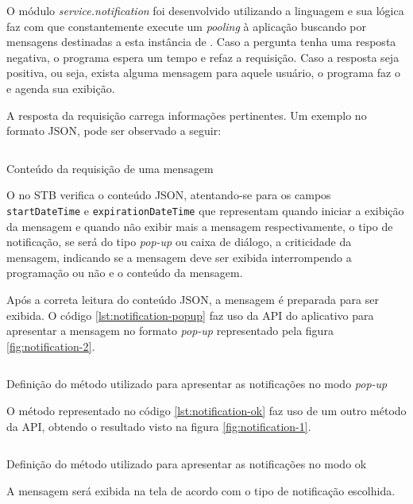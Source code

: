 O módulo \textit{service.notification} foi desenvolvido utilizando a linguagem
\python[] e sua lógica faz com que constantemente execute um \textit{pooling} à
aplicação buscando por mensagens destinadas a esta instância de \software. Caso
a pergunta tenha uma resposta negativa, o programa espera um tempo e refaz a
requisição. Caso a resposta seja positiva, ou seja, exista alguma mensagem para
aquele usuário, o programa faz o \download[] e agenda sua exibição. 

A resposta da requisição carrega informações pertinentes. Um exemplo no formato
JSON, pode ser observado a seguir:

\begin{listing}[ht!]
\inputminted{json}{codigos/message.json}
\caption{Conteúdo da requisição de uma mensagem}
\label{lst:notification-json}
\end{listing}

O \software[] no STB verifica o conteúdo JSON, atentando-se para os campos 
\texttt{startDateTime} e \texttt{expirationDateTime} que representam quando 
iniciar a exibição da mensagem e quando não exibir mais a mensagem 
respectivamente, o tipo de notificação, se será do tipo \textit{pop-up} ou
caixa de diálogo, a criticidade da mensagem, indicando se a mensagem deve ser
exibida interrompendo a programação ou não e o conteúdo da mensagem. 

Após a correta leitura do conteúdo JSON, a mensagem é preparada para ser 
exibida. O código \ref{lst:notification-popup} faz uso da API do aplicativo
\xbmc[] para apresentar a mensagem no formato \textit{pop-up} representado pela
figura \vref{fig:notification-2}.

\begin{listing}[ht!]
\inputminted{python}{codigos/notification-popup.py}
\caption{Definição do método utilizado para apresentar as notificações no modo
\textit{pop-up}}
\label{lst:notification-popup}
\end{listing}

O método representado no código \ref{lst:notification-ok} faz uso de um outro 
método da API, obtendo o resultado visto na figura \vref{fig:notification-1}.

\begin{listing}[ht!]
\inputminted{python}{codigos/notification-ok.py}
\caption{Definição do método utilizado para apresentar as notificações no modo
ok}
\label{lst:notification-ok}
\end{listing}

A mensagem será exibida na tela de acordo com o tipo de notificação escolhida. 

